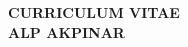 

\begin{center}
{\LARGE {\bf CURRICULUM VITAE}}\\
\vspace{0.5in}
{\large {\bf ALP AKPINAR}}
\end{center}

